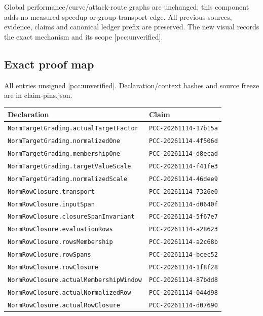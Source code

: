 \documentclass[
  10pt,
]{article}
\begin{document}
Global performance/curve/attack-route graphs are unchanged: this
component adds no measured speedup or group-transport edge. All previous
sources, evidence, claims and canonical ledger prefix are preserved. The
new visual records the exact mechanism and its scope
{[}pcc:unverified{]}.

\subsection{Exact proof map}\label{exact-proof-map}

All entries unsigned {[}pcc:unverified{]}. Declaration/context hashes
and source freeze are in claim-pins.json.

\begin{longtable}[]{@{}ll@{}}
\toprule\noalign{}
Declaration & Claim \\
\midrule\noalign{}
\endhead
\bottomrule\noalign{}
\endlastfoot
\texttt{NormTargetGrading.actualTargetFactor} &
\texttt{PCC-20261114-17b15a} \\
\texttt{NormTargetGrading.normalizedOne} &
\texttt{PCC-20261114-4f506d} \\
\texttt{NormTargetGrading.membershipOne} &
\texttt{PCC-20261114-d8ecad} \\
\texttt{NormTargetGrading.targetValueScale} &
\texttt{PCC-20261114-f41fe3} \\
\texttt{NormTargetGrading.normalizedScale} &
\texttt{PCC-20261114-46dee9} \\
\texttt{NormRowClosure.transport} & \texttt{PCC-20261114-7326e0} \\
\texttt{NormRowClosure.inputSpan} & \texttt{PCC-20261114-d0640f} \\
\texttt{NormRowClosure.closureSpanInvariant} &
\texttt{PCC-20261114-5f67e7} \\
\texttt{NormRowClosure.evaluationRows} & \texttt{PCC-20261114-a28623} \\
\texttt{NormRowClosure.rowsMembership} & \texttt{PCC-20261114-a2c68b} \\
\texttt{NormRowClosure.rowSpans} & \texttt{PCC-20261114-bcec52} \\
\texttt{NormRowClosure.rowClosure} & \texttt{PCC-20261114-1f8f28} \\
\texttt{NormRowClosure.actualMembershipWindow} &
\texttt{PCC-20261114-87bdd8} \\
\texttt{NormRowClosure.actualNormalizedRow} &
\texttt{PCC-20261114-044d98} \\
\texttt{NormRowClosure.actualRowClosure} &
\texttt{PCC-20261114-d07690} \\
\end{longtable}
\end{document}
